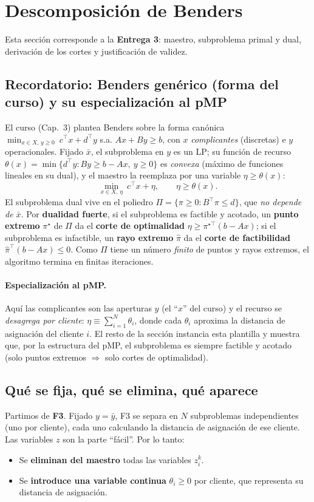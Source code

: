 \section{Descomposición de Benders}
\label{sec:benders}

Esta sección corresponde a la \textbf{Entrega 3}: maestro, subproblema primal y dual, derivación
de los cortes y justificación de validez.

\subsection{Recordatorio: Benders genérico (forma del curso) y su especialización al pMP}
El curso (Cap.~3) plantea Benders sobre la forma canónica
$\min_{x\in X,\,y\ge0}\ c^\top x + d^\top y$ s.a. $Ax+By\ge b$, con $x$ \emph{complicantes}
(discretas) e $y$ operacionales. Fijado $\bar x$, el subproblema en $y$ es un LP; su función de
recurso $\theta(x)=\min\{d^\top y: By\ge b-Ax,\ y\ge0\}$ es \emph{convexa} (máximo de funciones
lineales en su dual), y el maestro la reemplaza por una variable $\eta\ge\theta(x)$:
\[
  \min_{x\in X,\,\eta}\ c^\top x+\eta,\qquad \eta\ge\theta(x).
\]
El subproblema dual vive en el poliedro $\Pi=\{\pi\ge0:B^\top\pi\le d\}$, que \emph{no depende de
$\bar x$}. Por \textbf{dualidad fuerte}, si el subproblema es factible y acotado, un \textbf{punto
extremo} $\pi^\star$ de $\Pi$ da el \textbf{corte de optimalidad} $\eta\ge\pi^{\star\top}(b-Ax)$;
si el subproblema es infactible, un \textbf{rayo extremo} $\hat\pi$ da el \textbf{corte de
factibilidad} $\hat\pi^\top(b-Ax)\le0$. Como $\Pi$ tiene un número \emph{finito} de puntos y
rayos extremos, el algoritmo termina en finitas iteraciones.

\paragraph{Especialización al pMP.} Aquí las complicantes son las aperturas $y$ (el ``$x$'' del
curso) y el recurso se \emph{desagrega por cliente}: $\eta\equiv\sum_{i=1}^N\theta_i$, donde cada
$\theta_i$ aproxima la distancia de asignación del cliente $i$. El resto de la sección instancia
esta plantilla y muestra que, por la estructura del pMP, el subproblema es siempre factible y
acotado (solo puntos extremos $\Rightarrow$ solo cortes de optimalidad).

\subsection{Qué se fija, qué se elimina, qué aparece}
Partimos de \textbf{F3}. Fijado $y=\bar y$, F3 se separa en $N$ subproblemas independientes (uno
por cliente), cada uno calculando la distancia de asignación de ese cliente. Las variables $z$
son la parte ``fácil''. Por lo tanto:
\begin{itemize}[noitemsep]
  \item Se \textbf{eliminan del maestro} todas las variables $z^k_i$.
  \item Se \textbf{introduce una variable continua} $\theta_i\ge 0$ por cliente, que representa su
        distancia de asignación.
\end{itemize}

